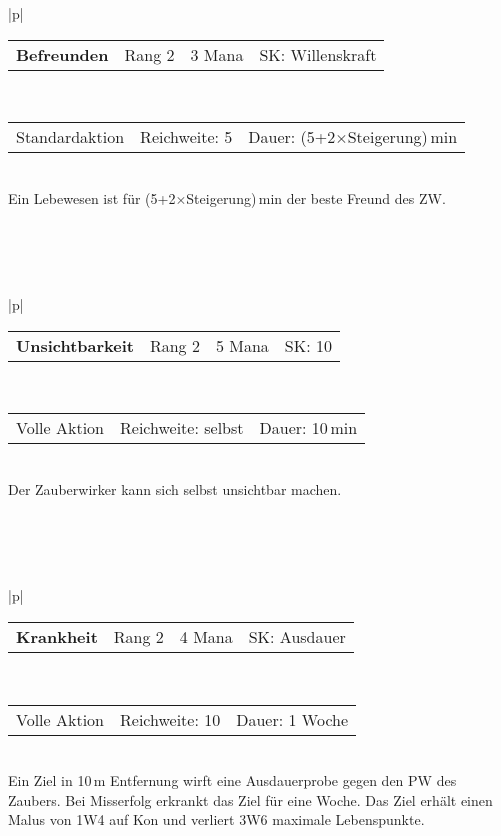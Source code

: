 \documentclass[../../Heldenanleitung2]{subfiles}
\begin{document}
\begin{tabular}{|p{\textwidth}|}
\hline
\begin{tabularx}{\textwidth}{X|X|X|X}
\textbf{Befreunden} & Rang 2 & 3 Mana & SK: Willenskraft
\end{tabularx} \\ \hline
\begin{tabularx}{\textwidth}{X|X|X}
Standardaktion & Reichweite: 5 & Dauer: (5+2$\times$Steigerung)\,min
\end{tabularx} \\ \hline
Ein Lebewesen ist für (5+2$\times$Steigerung)\,min der beste Freund des ZW.
\\ \hline
\end{tabular}
\\\\\\
\begin{tabular}{|p{\textwidth}|}
\hline
\begin{tabularx}{\textwidth}{X|X|X|X}
\textbf{Unsichtbarkeit} & Rang 2 & 5 Mana & SK: 10
\end{tabularx} \\ \hline
\begin{tabularx}{\textwidth}{X|X|X}
Volle Aktion & Reichweite: selbst & Dauer: 10\,min
\end{tabularx} \\ \hline
Der Zauberwirker kann sich selbst unsichtbar machen.
\\ \hline
\end{tabular}
\\\\\\
\begin{tabular}{|p{\textwidth}|}
\hline
\begin{tabularx}{\textwidth}{X|X|X|X}
\textbf{Krankheit} & Rang 2 & 4 Mana & SK: Ausdauer
\end{tabularx} \\ \hline
\begin{tabularx}{\textwidth}{X|X|X}
Volle Aktion & Reichweite: 10 & Dauer: 1 Woche
\end{tabularx} \\ \hline
Ein Ziel in 10\,m Entfernung wirft eine Ausdauerprobe gegen den PW des Zaubers. Bei Misserfolg erkrankt das Ziel für eine Woche. Das Ziel erhält einen Malus von 1W4 auf Kon und verliert 3W6 maximale Lebenspunkte.
\\ \hline
\end{tabular}
\\\\\\
\end{document}
